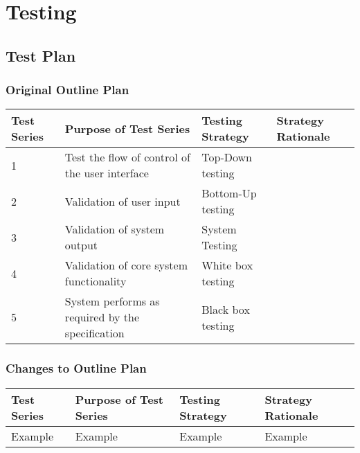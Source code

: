 \chapter{Testing}

\section{Test Plan}

\begin{landscape}
\subsection{Original Outline Plan}

\begin{center}
    \begin{tabular}{|p{2cm}|p{5cm}|p{5cm}|p{4cm}|}
        \hline
        \textbf{Test Series} & \textbf{Purpose of Test Series} & \textbf{Testing Strategy} & \textbf{Strategy Rationale}\\ \hline
        1 & Test the flow of control of the user interface  & Top-Down testing &  \\ \hline
        2 & Validation of user input & Bottom-Up testing &  \\ \hline
        3 & Validation of system output & System Testing & \\ \hline
        4 & Validation of core system functionality & White box testing & \\ \hline
        5 & System performs as required by the specification & Black box testing & \\ \hline
    \end{tabular}
\end{center}

\subsection{Changes to Outline Plan}

\begin{center}
    \begin{tabular}{|p{2cm}|p{5cm}|p{5cm}|p{4cm}|}
        \hline
        \textbf{Test Series} & \textbf{Purpose of Test Series} & \textbf{Testing Strategy} & \textbf{Strategy Rationale}\\ \hline
        Example & Example & Example & Example \\ \hline
    \end{tabular}
\end{center}


\end{landscape}

